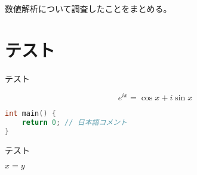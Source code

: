 \documentclass[a4j,dvipdfmx,
]{jsbook}
\begin{document}
\maketitle
\pagestyle{kentaf}

\vskip20pt

数値解析について調査したことをまとめる。

\vskip20pt

\setcounter{tocdepth}{1}
\tableofcontents

\clearpage

\pagestyle{kenta}

\section{テスト}

テスト

\begin{equation}
    e^{ix} = \cos{x} + i \sin{x}
\end{equation}

\begin{lstlisting}[caption=テスト, language={C++}]
int main() {
    return 0; // 日本語コメント
}
\end{lstlisting}

\begin{algorithm}
    \caption{テスト}
    \begin{algorithmic}
        \State $x = y$
        \EndProcedure
    \end{algorithmic}
\end{algorithm}

\cite{Hirayama2014}



\end{document}

